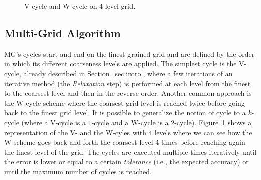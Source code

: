  



\begin{figure}[hbt]
 \resizebox{\linewidth}{!}{
    
 }
 \caption{V-cycle and W-cycle on 4-level grid.}
 \label{fig.cycles}
\end{figure}

\subsection{Multi-Grid Algorithm}
\label{sec:algo}

MG's cycles start and end on the finest grained grid and are defined by the
order in which its different coarseness levels are applied.  The simplest cycle
is the V-cycle, already described in Section~\ref{sec:intro}, where a few
iterations of an iterative method (the \textit{Relaxation} step) is performed
at each level from the finest to the coarsest level and then in the reverse
order.  Another common approach is the W-cycle scheme where the coarsest grid
level is reached twice before going back to the finest grid level.  It is
possible to generalize the notion of cycle to a $k$-cycle (where a V-cycle is a
$1$-cycle and a W-cycle is a $2$-cycle).  Figure~\ref{fig.cycles} shows a
representation of the V- and the W-cyles with 4 levels where we can see how the
W-scheme goes back and forth the coarsest level 4 times before reaching again
the finest level of the grid.  The cycles are executed multiple times
iteratively until the error is lower or equal to a certain \emph{tolerance}
(i.e., the expected accuracy) or until the maximum number of cycles is reached.


